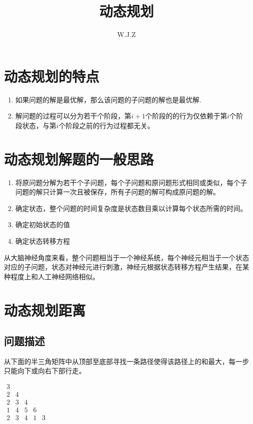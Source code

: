 \documentclass{article}
\title{动态规划}
\author{W.J.Z}
\date{}
\begin{document}
	\maketitle
	\section{动态规划的特点}
	\begin{enumerate}
		\item 如果问题的解是最优解，那么该问题的子问题的解也是最优解.
		\item 解问题的过程可以分为若干个阶段，第$i+1$个阶段的的行为仅依赖于第$i$个阶段状态，与第$i$个阶段之前的行为过程都无关。
	\end{enumerate}

	\section{动态规划解题的一般思路}
	\begin{enumerate}
		\item 将原问题分解为若干个子问题，每个子问题和原问题形式相同或类似，每个子问题的解只计算一次且被保存，所有子问题的解可构成原问题的解。
		\item 确定状态，整个问题的时间复杂度是状态数目乘以计算每个状态所需的时间。
		\item 确定初始状态的值
		\item 确定状态转移方程
	\end{enumerate}
	从大脑神经角度来看，整个问题相当于一个神经系统，每个神经元相当于一个状态对应的子问题，状态对神经元进行刺激，神经元根据状态转移方程产生结果，在某种程度上和人工神经网络相似。
	
	\section{动态规划距离}
	\subsection{问题描述}
	从下面的半三角矩阵中从顶部至底部寻找一条路径使得该路径上的和最大，每一步只能向下或向右下部行走。
	
     $\begin{matrix}
     	3 &  &  &  & \\ 
     	2&4  &  &  & \\ 
     	2& 3 & 4 &  & \\ 
     	1& 4 & 5 &6  & \\ 
     	2& 3 & 4 &  1& 3
     \end{matrix}$
\end{document}
